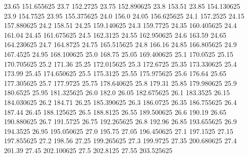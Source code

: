           23.65       151.655625
           23.7         152.2725
          23.75       152.890625
           23.8           153.51
          23.85       154.130625
           23.9         154.7525
          23.95       155.375625
           24.0            156.0
          24.05       156.625625
           24.1         157.2525
          24.15       157.880625
           24.2           158.51
          24.25       159.140625
           24.3         159.7725
          24.35       160.405625
           24.4           161.04
          24.45       161.675625
           24.5         162.3125
          24.55       162.950625
           24.6           163.59
          24.65       164.230625
           24.7         164.8725
          24.75       165.515625
           24.8           166.16
          24.85       166.805625
           24.9         167.4525
          24.95       168.100625
           25.0           168.75
          25.05       169.400625
           25.1         170.0525
          25.15       170.705625
           25.2           171.36
          25.25       172.015625
           25.3         172.6725
          25.35       173.330625
           25.4           173.99
          25.45       174.650625
           25.5         175.3125
          25.55       175.975625
           25.6           176.64
          25.65       177.305625
           25.7         177.9725
          25.75       178.640625
           25.8           179.31
          25.85       179.980625
           25.9         180.6525
          25.95       181.325625
           26.0            182.0
          26.05       182.675625
           26.1         183.3525
          26.15       184.030625
           26.2           184.71
          26.25       185.390625
           26.3         186.0725
          26.35       186.755625
           26.4           187.44
          26.45       188.125625
           26.5         188.8125
          26.55       189.500625
           26.6           190.19
          26.65       190.880625
           26.7         191.5725
          26.75       192.265625
           26.8           192.96
          26.85       193.655625
           26.9         194.3525
          26.95       195.050625
           27.0           195.75
          27.05       196.450625
           27.1         197.1525
          27.15       197.855625
           27.2           198.56
          27.25       199.265625
           27.3         199.9725
          27.35       200.680625
           27.4           201.39
          27.45       202.100625
           27.5         202.8125
          27.55       203.525625
